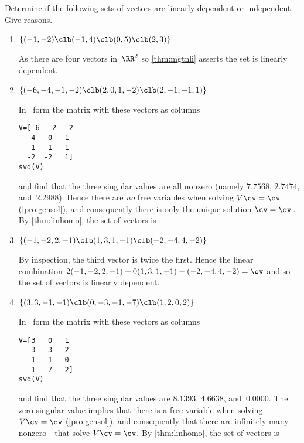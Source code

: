 \begin{example} 
Determine if the following sets of vectors are linearly dependent or independent.  Give reasons.

\begin{enumerate}
\item \(\{(-1,-2)\clb (-1,4)\clb (0,5)\clb (2,3)\}\)
\begin{solution} 
As there are four vectors in~\(\RR^2\) so \cref{thm:mgtnli} asserts the set is linearly dependent.
\end{solution}

\item \(\{(-6,-4,-1,-2)\clb (2,0,1,-2)\clb (2,-1,-1,1)\}\)
\begin{solution} 
In \script\ form the matrix with these vectors as columns
\begin{verbatim}
V=[-6   2   2
  -4   0  -1
  -1   1  -1
  -2  -2   1]
svd(V)
\end{verbatim}
\setbox\ajrqrbox\hbox{}%
\marginajrbox%
and find that the three singular values are all nonzero (namely \(7.7568\), \(2.7474\), and~\(2.2988\)).
Hence there are \emph{no} free variables when solving \(V\cv=\ov\) (\cref{pro:gensol}), and consequently there is only the unique solution \(\cv=\ov\)\,.
By \cref{thm:linhomo}, the set of vectors is 
\end{solution}

\item \(\{(-1,-2,2,-1)\clb (1,3,1,-1)\clb (-2,-4,4,-2)\}\)
\begin{solution} 
By inspection, the third vector is twice the first.
Hence the linear combination \(2(-1,-2,2,-1)+0(1,3,1,-1)-(-2,-4,4,-2)=\ov\) and so the set of vectors is linearly dependent. 
\end{solution}


\item \(\{(3,3,-1,-1)\clb (0,-3,-1,-7)\clb (1,2,0,2)\}\)
\begin{solution} 
In \script\ form the matrix with these vectors as columns
\begin{verbatim}
V=[3   0   1
   3  -3   2
  -1  -1   0
  -1  -7   2]
svd(V)
\end{verbatim}
\setbox\ajrqrbox\hbox{}%
\marginajrbox%
and find that the three singular values are \(8.1393\), \(4.6638\), and~\(0.0000\).
The zero singular value implies that there is a free variable when solving \(V\cv=\ov\) (\cref{pro:gensol}), and consequently that there are infinitely many nonzero~\cv\ that solve \(V\cv=\ov\).
By \cref{thm:linhomo}, the set of vectors is 
\end{solution}


\end{enumerate}
\end{example}
